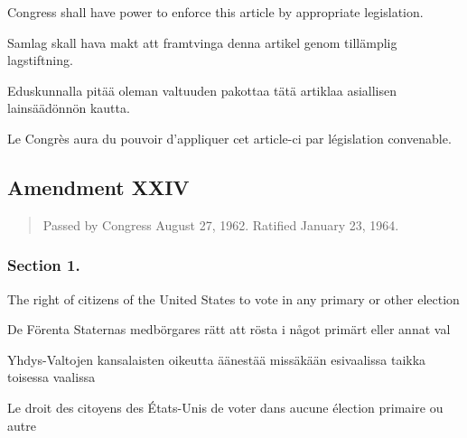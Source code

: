 \documentclass[a4,landscape,12pt]{article}
\begin{document}
\begin{minipage}[t]{0.22\textwidth}
	Congress shall have power to enforce this article by appropriate legislation.
\end{minipage}\textwidth
\begin{minipage}[t]{0.22\textwidth}
	Samlag skall hava makt att framtvinga denna artikel genom tillämplig lagstiftning.
\end{minipage}\textwidth
\begin{minipage}[t]{0.22\textwidth}
	Eduskunnalla pitää oleman valtuuden pakottaa tätä artiklaa asiallisen lainsäädönnön kautta.
\end{minipage}\textwidth
\begin{minipage}[t]{0.22\textwidth}
Le Congrès aura du pouvoir d'appliquer cet article-ci par législation convenable.
\end{minipage}

\subsection*{Amendment XXIV}
\begin{quote}\small
Passed by Congress August 27, 1962. Ratified January 23, 1964.
\end{quote}
\subsubsection*{Section 1.}
\begin{minipage}[t]{0.22\textwidth}
	The right of citizens of the United States to vote in any primary or other election
\end{minipage}\textwidth
\begin{minipage}[t]{0.22\textwidth}
	De Förenta Staternas medbörgares rätt att rösta i något primärt eller annat val
\end{minipage}\textwidth
\begin{minipage}[t]{0.22\textwidth}
	Yhdys-Valtojen kansalaisten oikeutta äänestää missäkään esivaalissa taikka toisessa vaalissa
\end{minipage}\textwidth
\begin{minipage}[t]{0.22\textwidth}
	Le droit des citoyens des États-Unis de voter dans aucune élection primaire ou autre
	\end{minipage}
\end{document}
